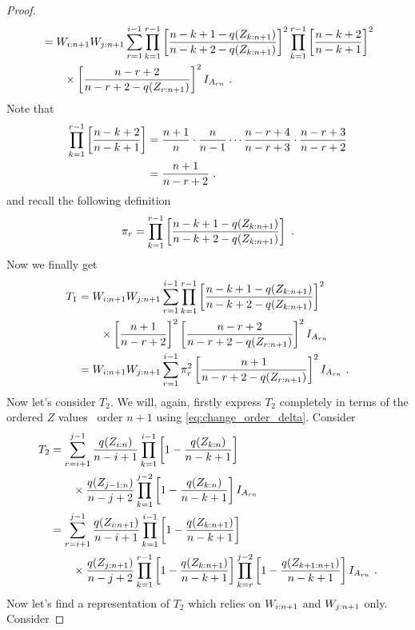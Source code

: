 \begin{proof}
\begin{align*}
	&= W_{i:n+1}W_{j:n+1}\sum\limits_{r=1}^{i-1}\prod_{k=1}^{r-1} \left[ \frac{n-k+1-q(Z_{k:n+1})}{n-k+2-q(Z_{k:n+1})}\right]^2\prod_{k=1}^{r-1} \left[ \frac{n-k+2}{n-k+1}\right]^2\\
	& \qquad \times \left[ \frac{n-r+2}{n-r+2-q(Z_{r:n+1})}\right]^2I_{A_{rn}}\textrm{ .}
\end{align*}
%
Note that 
\begin{align}
	\prod_{k=1}^{r-1}\left[\frac{n-k+2}{n-k+1}\right] &= \frac{n+1}{n} \cdot \frac{n}{n-1} \cdots \frac{n-r+4}{n-r+3} \cdot \frac{n-r+3}{n-r+2}\nonumber\\
	&= \frac{n+1}{n-r+2}\textrm{ .}
	\label{eq:telescope_prod}
\end{align}
%
and recall the following definition
\begin{equation*}
	\pi_r = \prod_{k=1}^{r-1} \left[ \frac{n-k+1-q(Z_{k:n+1})}{n-k+2-q(Z_{k:n+1})}\right]\textrm{ .}
\end{equation*}
%
Now we finally get	
\begin{align*}		
	T_1 &= W_{i:n+1}W_{j:n+1}\sum\limits_{r=1}^{i-1}\prod_{k=1}^{r-1} \left[ \frac{n-k+1-q(Z_{k:n+1})}{n-k+2-q(Z_{k:n+1})}\right]^2\\
	& \qquad \times\left[\frac{n+1}{n-r+2}\right]^2 \left[ \frac{n-r+2}{n-r+2-q(Z_{r:n+1})}\right]^2I_{A_{rn}}\\
	&= W_{i:n+1}W_{j:n+1}\sum\limits_{r=1}^{i-1}\pi_r^2 \left[ \frac{n+1}{n-r+2-q(Z_{r:n+1})}\right]^2I_{A_{rn}}\textrm{ .}
\end{align*}
%
Now let's consider $T_2$. We will, again, firstly express $T_2$ completely in terms of the ordered $Z$ values \wrt\ order $n+1$ using \eqref{eq:change_order_delta}. Consider
\begin{align*}
	T_2 &= \sum\limits_{r=i+1}^{j-1} \frac{q(Z_{i:n})}{n-i+1} \prod\limits_{k=1}^{i-1}\left[1-\frac{q(Z_{k:n})}{n-k+1}\right]\\
	    & \qquad \times \frac{q(Z_{j-1:n})}{n-j+2} \prod\limits_{k=1}^{j-2}\left[1-\frac{q(Z_{k:n})}{n-k+1}\right]I_{A_{rn}}\\
		&= \sum\limits_{r=i+1}^{j-1} \frac{q(Z_{i:n+1})}{n-i+1} \prod_{k=1}^{i-1}\left[1-\frac{q(Z_{k:n+1})}{n-k+1}\right]\\
		& \qquad \times \frac{q(Z_{j:n+1})}{n-j+2} \prod_{k=1}^{r-1}\left[1-\frac{q(Z_{k:n+1})}{n-k+1}\right]\prod_{k=r}^{j-2}\left[1-\frac{q(Z_{k+1:n+1})}{n-k+1}\right]I_{A_{rn}}\textrm{ .}
\end{align*}
%
Now let's find a representation of $T_2$ which relies on $W_{i:n+1}$ and $W_{j:n+1}$ only. Consider

\end{proof}
